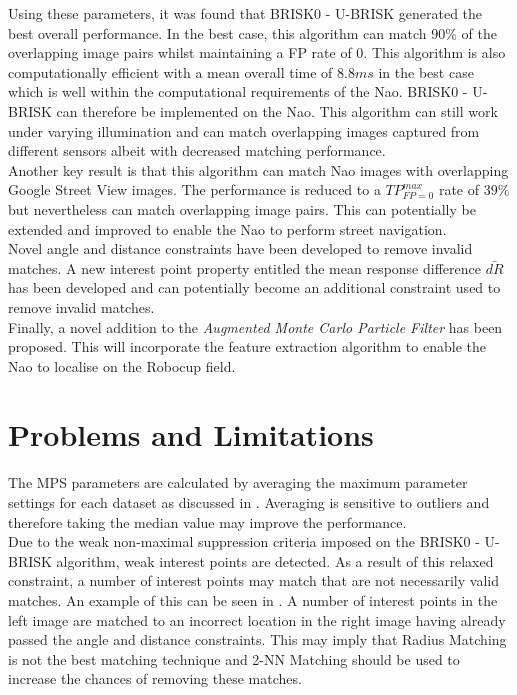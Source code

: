 \documentclass[11pt]{report}
\begin{document}
Using these parameters, it was found that BRISK0 - U-BRISK generated the best overall performance. In the best case, this algorithm can match $90\%$ of the overlapping image pairs whilst maintaining a FP rate of $0$. This algorithm is also computationally efficient with a mean overall time of $8.8 ms$ in the best case which is well within the computational requirements of the Nao. BRISK0 - U-BRISK can therefore be implemented on the Nao. This algorithm can still work under varying illumination and can match overlapping images captured from different sensors albeit with decreased matching performance.\\

Another key result is that this algorithm can match Nao images with overlapping Google Street View images. The performance is reduced to a $TP_{FP=0}^{max}$ rate of $39\%$ but nevertheless can match overlapping image pairs. This can potentially be extended and improved to enable the Nao to perform street navigation.\\

Novel angle and distance constraints have been developed to remove invalid matches. A new interest point property entitled the mean response difference $\bar{dR}$ has been developed and can potentially become an additional constraint used to remove invalid matches.\\

Finally, a novel addition to the \textit{Augmented Monte Carlo Particle Filter} has been proposed. This will incorporate the feature extraction algorithm to enable the Nao to localise on the Robocup field.\\



\section{Problems and Limitations}
\label{sec:problemsLimitations}
The MPS parameters are calculated by averaging the maximum parameter settings for each dataset as discussed in . Averaging is sensitive to outliers and therefore taking the median value may improve the performance.\\

Due to the weak non-maximal suppression criteria imposed on the BRISK0 - U-BRISK algorithm, weak interest points are detected.  As a result of this relaxed constraint, a number of interest points may match that are not necessarily valid matches. An example of this can be seen in . A number of interest points in the left image are matched to an incorrect location in the right image having already passed the angle and distance constraints. This may imply that Radius Matching is not the best matching technique and 2-NN Matching should be used to increase the chances of removing these matches.\\
\end{document}
